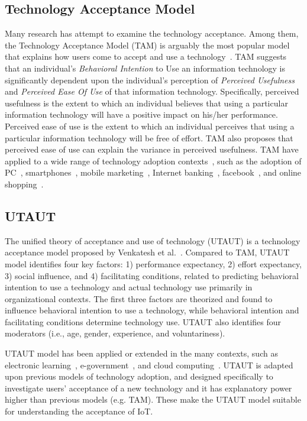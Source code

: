 \subsection{Technology Acceptance Model}
Many research has attempt to examine the technology acceptance. Among them, the Technology Acceptance Model (TAM) is arguably the most popular model that explains how users come to accept and use a technology~\cite{davis1989user}. TAM suggests that an individual's \textit{Behavioral Intention} to Use an information technology is significantly dependent upon the individual's perception of \textit{Perceived Usefulness} and \textit{Perceived Ease Of Use} of that information technology. Specifically, perceived usefulness is the extent to which an individual believes that using a particular information technology will have a positive impact on his/her performance. Perceived ease of use is the extent to which an individual perceives that using a particular information technology will be free of effort. TAM also proposes that perceived ease of use can explain the variance in perceived usefulness.
TAM have applied to a wide range of technology adoption contexts~\cite{wixom2005theoretical}, such as the adoption of PC~\cite{venkatesh2001longitudinal}, smartphones~\cite{park2007acceptance}, mobile marketing~\cite{bauer2005driving}, Internet banking~\cite{pikkarainen2004consumer}, facebook~\cite{lee2012effect, rauniar2014technology}, and online shopping~\cite{gefen2003trust}.

\subsection{UTAUT}
The unified theory of acceptance and use of technology (UTAUT) is a technology acceptance model proposed by Venkatesh et al.~\cite{venkatesh2003user}. Compared to TAM, UTAUT model identifies four key factors: 1) performance expectancy, 2) effort expectancy, 3) social influence, and 4) facilitating conditions, related to predicting behavioral intention to use a technology and actual technology use primarily in organizational contexts. The first three factors are theorized and found to influence behavioral intention to use a technology, while behavioral intention and facilitating conditions determine technology use. UTAUT also identifies four moderators (i.e., age, gender, experience, and voluntariness).

UTAUT model has been applied or extended in the many contexts, such as electronic learning~\cite{wang2009interactive}, e-government~\cite{weerakkody2013examining}, and cloud computing~\cite{lian2015critical}. UTAUT is adapted upon previous models of technology adoption, and designed specifically to investigate users’ acceptance of a new technology and it has explanatory power higher than previous models (e.g. TAM). These make the UTAUT model suitable for understanding the acceptance of IoT.

